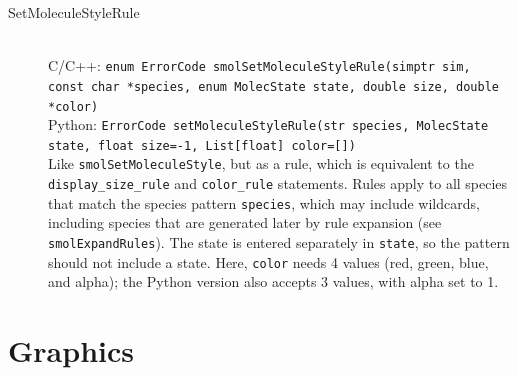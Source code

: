 \documentclass {scrbook}
\newcommand {\ttt} {\texttt}
\begin{document}
\begin{description}
\item[SetMoleculeStyleRule]
\hfill \\
C/C++: \ttt{enum ErrorCode smolSetMoleculeStyleRule(simptr sim, const char *species, enum MolecState state, double size, double *color)}\\
Python: \ttt{ErrorCode setMoleculeStyleRule(str species, MolecState state, float size=-1, List[float] color=[])}\\
Like \ttt{smolSetMoleculeStyle}, but as a rule, which is equivalent to the \ttt{display\_size\_rule} and \ttt{color\_rule} statements. Rules apply to all species that match the species pattern \ttt{species}, which may include wildcards, including species that are generated later by rule expansion (see \ttt{smolExpandRules}). The state is entered separately in \ttt{state}, so the pattern should not include a state. Here, \ttt{color} needs 4 values (red, green, blue, and alpha); the Python version also accepts 3 values, with alpha set to 1.

\end{description}


\section{Graphics}
\end{document}
